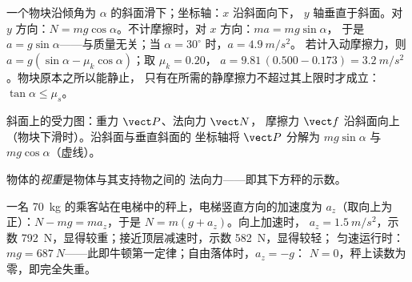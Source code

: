 \begin{example}[斜面问题两次求解]\label{ex:g12:newtons-laws:incline}
一个物块沿倾角为 $\alpha$ 的斜面滑下；坐标轴：$x$ 沿斜面向下，
$y$ 轴垂直于斜面。对 $y$ 方向：$N = mg\cos\alpha$。不计摩擦时，对 $x$ 方向：$ma = mg\sin\alpha$，
于是 $a = g\sin\alpha$——与质量无关；当 $\alpha = 30^\circ$ 时，$a = \qty{4.9}{m/s^2}$。
若计入动摩擦力，则 $a = g(\sin\alpha - \mu_k\cos\alpha)$；取 $\mu_k = 0.20$，
$a = 9.81\,(0.500 - 0.173) = \qty{3.2}{m/s^2}$。物块原本之所以能静止，
只有在所需的静摩擦力不超过其上限时才成立：$\tan\alpha \leq \mu_s$。
\end{example}

\begin{omfigure}

{\small 斜面上的受力图：重力 $\vect P$、法向力 $\vect N$，
摩擦力 $\vect f$ 沿斜面向上（物块下滑时）。沿斜面与垂直斜面的
坐标轴将 $\vect P$ 分解为 $mg\sin\alpha$ 与 $mg\cos\alpha$（虚线）。}
\end{omfigure}

\begin{definition}[视重]\label{def:g12:newtons-laws:apparent}
物体的\emph{视重}是物体与其支持物之间的
法向力——即其下方秤的示数。
\end{definition}

\begin{example}[电梯]\label{ex:g12:newtons-laws:elevator}
一名 \qty{70}{kg} 的乘客站在电梯中的秤上，电梯竖直方向的加速度为
$a_z$（取向上为正）：$N - mg = ma_z$，于是 $N = m(g + a_z)$。向上加速时，
$a_z = \qty{1.5}{m/s^2}$，示数 \qty{792}{N}，显得较重；接近顶层减速时，示数 \qty{582}{N}，显得较轻；
匀速运行时：$mg = \qty{687}{N}$——此即牛顿第一定律；自由落体时，$a_z = -g$：
$N = 0$，秤上读数为零，即完全失重。
\end{example}

